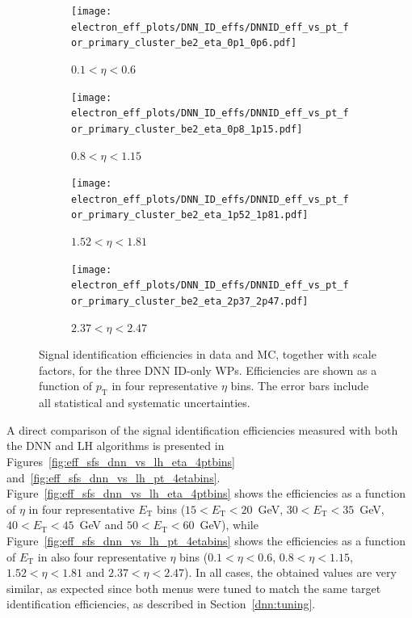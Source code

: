 \begin{figure}[htbp]
  \centering

  \begin{subfigure}[b]{0.48\textwidth}
    \centering
    \texttt{[image: electron\_eff\_plots/DNN\_ID\_effs/DNNID\_eff\_vs\_pt\_for\_primary\_cluster\_be2\_eta\_0p1\_0p6.pdf]}
    \caption{$0.1 < \eta < 0.6$}
    \label{fig:eff_sfs_dnn_etabin1}
  \end{subfigure}
  \hfill
  \begin{subfigure}[b]{0.48\textwidth}
    \centering
    \texttt{[image: electron\_eff\_plots/DNN\_ID\_effs/DNNID\_eff\_vs\_pt\_for\_primary\_cluster\_be2\_eta\_0p8\_1p15.pdf]}
    \caption{$0.8 < \eta < 1.15$}
    \label{fig:eff_sfs_dnn_etabin2}
  \end{subfigure}

  \vspace{0.5cm}

  \begin{subfigure}[b]{0.48\textwidth}
    \centering
    \texttt{[image: electron\_eff\_plots/DNN\_ID\_effs/DNNID\_eff\_vs\_pt\_for\_primary\_cluster\_be2\_eta\_1p52\_1p81.pdf]}
    \caption{$1.52 < \eta < 1.81$}
    \label{fig:eff_sfs_dnn_etabin3}
  \end{subfigure}
  \hfill
  \begin{subfigure}[b]{0.48\textwidth}
    \centering
    \texttt{[image: electron\_eff\_plots/DNN\_ID\_effs/DNNID\_eff\_vs\_pt\_for\_primary\_cluster\_be2\_eta\_2p37\_2p47.pdf]}
    \caption{$2.37 < \eta < 2.47$}
    \label{fig:eff_sfs_dnn_etabin4}
  \end{subfigure}

  \caption{
    Signal identification efficiencies in data and MC, together with scale factors, 
    for the three DNN ID-only WPs. 
    Efficiencies are shown as a function of $p_{\text{T}}$ in four representative $\eta$ bins. 
    The error bars include all statistical and systematic uncertainties.}
  \label{fig:eff_sfs_dnn_pt_4etabins}
\end{figure}


A direct comparison of the signal identification efficiencies measured with both the DNN and LH algorithms is presented in Figures~\ref{fig:eff_sfs_dnn_vs_lh_eta_4ptbins} and~\ref{fig:eff_sfs_dnn_vs_lh_pt_4etabins}. 
Figure~\ref{fig:eff_sfs_dnn_vs_lh_eta_4ptbins} shows the efficiencies as a function of $\eta$ in four representative $E_{\mathrm{T}}$ bins ($15 < E_{\mathrm{T}} < 20$~GeV, $30 < E_{\mathrm{T}} < 35$~GeV, $40 < E_{\mathrm{T}} < 45$~GeV and $50 < E_{\mathrm{T}} < 60$~GeV), 
while Figure~\ref{fig:eff_sfs_dnn_vs_lh_pt_4etabins} shows the efficiencies as a function of $E_{\mathrm{T}}$ in also four representative $\eta$ bins ($0.1 < \eta < 0.6$, $0.8 < \eta < 1.15$, $1.52 < \eta < 1.81$ and $2.37 < \eta < 2.47$). 
In all cases, the obtained values are very similar, as expected since both menus were tuned to match the same target identification efficiencies, as described in Section~\ref{dnn:tuning}.

